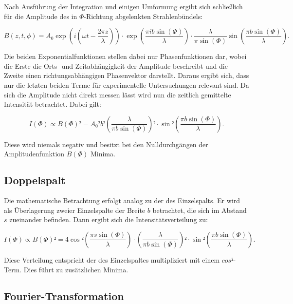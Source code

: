 Nach Ausführung der Integration und einigen Umformung ergibt sich schließlich für die Amplitude 
des in $\Phi$-Richtung abgelenkten Strahlenbündels: 

\begin{equation*}
B(z,t,\phi) = A_0 \exp{\left(i\left(\omega t - \frac{2\pi z}{\lambda}\right)\right)}\cdot \exp{\left(\frac{\pi i b \sin{(\Phi)}}{\lambda}\right)}\cdot
\frac{\lambda}{\pi \sin{(\Phi)}}\sin{\left(\frac{\pi b \sin{(\Phi)}}{\lambda}\right)}.
\end{equation*}

Die beiden Exponentialfunktionen stellen dabei nur Phasenfunktionen dar, wobei die Erste die Orts- und Zeitabhängigkeit 
der Amplitude beschreibt und die Zweite einen richtungsabhängigen Phasenvektor darstellt. Daraus ergibt sich, dass nur 
die letzten beiden Terme für experimentelle Untersuchungen relevant sind. Da sich die Amplitude nicht direkt 
messen lässt wird nun die zeitlich gemittelte Intensität betrachtet. Dabei gilt: 

\begin{equation*}
I(\Phi) \propto B(\Phi)² = A_0² b² \left(\frac{\lambda}{\pi b \sin{(\Phi)}}\right)²\cdot \sin²{\left(\frac{\pi b \sin{(\Phi)}}{\lambda}\right)}.
\end{equation*}

Diese wird niemals negativ und besitzt bei den Nulldurchgängen der Amplitudenfunktion $B(\Phi)$ Minima. 

\subsection{Doppelspalt}

Die mathematische Betrachtung erfolgt analog zu der des Einzelspalts. Er wird als Überlagerung zweier Einzelspalte
der Breite $b$ betrachtet, die sich im Abstand $s$ zueinander befinden. Dann ergibt sich die Intensitätsverteilung
zu: 

\begin{equation*}
I(\Phi) \propto B(\Phi)² = 4 \cos²{\left(\frac{\pi s \sin{(\Phi)}}{\lambda}\right)}\cdot \left(\frac{\lambda}{\pi b \sin{(\Phi)}}\right)² 
\cdot \sin²{\left(\frac{\pi b \sin{(\Phi)}}{\lambda}\right)}. 
\end{equation*}

Diese Verteilung entspricht der des Einzelspaltes multipliziert mit einem $cos²$-Term. Dies führt zu zusätzlichen
Minima. 

\subsection{Fourier-Transformation}

